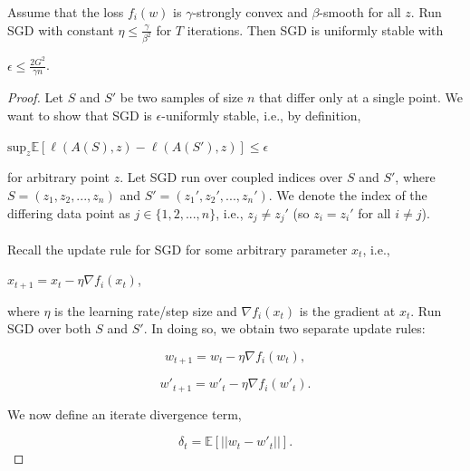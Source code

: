 \documentclass[10pt,a4paper]{amsart}
\begin{document}
\begin{theorem}
Assume that the loss $f_i(w)$ is $\gamma$-strongly convex and $\beta$-smooth for all $z$. Run SGD with constant $\eta \leq \frac{\gamma}{\beta^2}$ for $T$ iterations. Then SGD is uniformly stable with

\begin{center}
$\epsilon \leq \frac{2G^2}{\gamma n}$.
\end{center}
\end{theorem}

\begin{proof}
Let $S$ and $S'$ be two samples of size $n$ that differ only at a single point. We want to show that SGD is $\epsilon$-uniformly stable, i.e., by definition,

\begin{center}
$\text{sup}_z \mathbb{E}[\ell(A(S), z) - \ell(A(S'), z)] \leq \epsilon$
\end{center}

\noindent
for arbitrary point $z$. Let SGD run over coupled indices over $S$ and $S'$, where $S = (z_1, z_2, ... , z_n)$ and $S' = (z_1', z_2', ... , z_n')$. We denote the index of the differing data point as $j \in \{1,2, ... , n\}$, i.e., $z_j \neq z_j'$ (so $z_i = z_i'$ for all $i \neq j$). \\
\\
Recall the update rule for SGD for some arbitrary parameter $x_t$, i.e., 

\begin{center}
$x_{t+1} = x_t - \eta \nabla f_i(x_t)$,
\end{center}

\noindent
where $\eta$ is the learning rate/step size and $\nabla f_i(x_t)$ is the gradient at $x_t$. Run SGD over both $S$ and $S'$. In doing so, we obtain two separate update rules:

\begin{equation}
w_{t+1} = w_t - \eta \nabla f_i(w_t),
\end{equation}

\begin{equation}
w'_{t+1} = w'_t - \eta \nabla f_i(w'_t).
\end{equation}

\noindent
We now define an iterate divergence term,

\begin{equation}
\delta_t = \mathbb{E}[||w_t - w'_t||].
\end{equation}


\end{proof}
\end{document}
